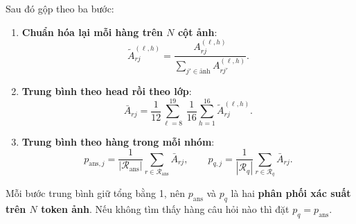 \documentclass[11pt,a4paper]{article}
\begin{document}
Sau đó gộp theo ba bước:
\begin{enumerate}[leftmargin=*]
\item \textbf{Chuẩn hóa lại mỗi hàng trên $N$ cột ảnh}:
\begin{equation}
\tilde A^{(\ell,h)}_{rj}=\frac{A^{(\ell,h)}_{rj}}{\sum_{j'\in\text{ảnh}}A^{(\ell,h)}_{rj'}}.
\end{equation}
\item \textbf{Trung bình theo head rồi theo lớp}:
\begin{equation}
\bar A_{rj}=\frac{1}{12}\sum_{\ell=8}^{19}\ \frac{1}{16}\sum_{h=1}^{16}\tilde A^{(\ell,h)}_{rj}.
\end{equation}
\item \textbf{Trung bình theo hàng trong mỗi nhóm}:
\begin{equation}
p_{\text{ans},j}=\frac{1}{|\mathcal{R}_\text{ans}|}\sum_{r\in\mathcal{R}_\text{ans}}\bar A_{rj},\qquad
p_{q,j}=\frac{1}{|\mathcal{R}_q|}\sum_{r\in\mathcal{R}_q}\bar A_{rj}.
\end{equation}
\end{enumerate}
Mỗi bước trung bình giữ tổng bằng 1, nên $p_\text{ans}$ và $p_q$ là hai \textbf{phân phối xác suất trên $N$ token ảnh}. Nếu không tìm thấy hàng câu hỏi nào thì đặt $p_q=p_\text{ans}$.
\end{document}
